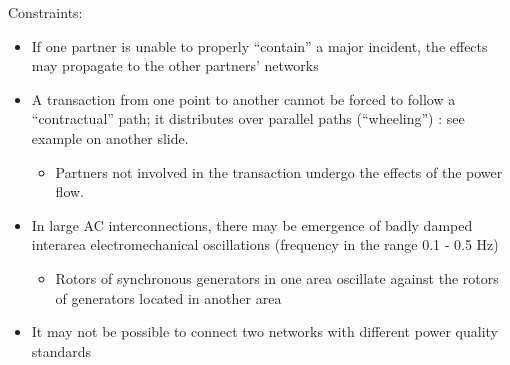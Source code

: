 \begin{frame}
{Constraints:}
\begin{itemize}
\item If one partner is unable to properly “contain” a major incident, the effects may propagate to the other partners’ networks
\item A transaction from one point to another cannot be forced to follow a “contractual” path; it distributes over parallel paths (“wheeling”) : see example on another slide.
\begin{itemize}
\item Partners not involved in the transaction undergo the effects of the power flow.
\end{itemize}
\item In large AC interconnections, there may be emergence of badly damped interarea electromechanical oscillations (frequency in the range 0.1 - 0.5 Hz)
\begin{itemize}
\item Rotors of synchronous generators in one area oscillate against the rotors of generators located in another area
\end{itemize}
\item It may not be possible to connect two networks with different power quality standards
\end{itemize}
\end{frame}

